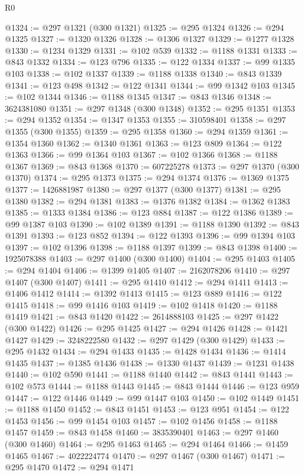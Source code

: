 \begin{lexlean}{R0}
\begin{coremodule}
@1324 := @297 @1321 (@300 @1321)
@1325 := @295 @1324
@1326 := @294 @1325
@1327 := @1320 @1326
@1328 := @1306 @1327
@1329 := @1277 @1328
@1330 := @1234 @1329
@1331 := @102 @539
@1332 := @1188 @1331
@1333 := @843 @1332
@1334 := @123 @796
@1335 := @122 @1334
@1337 := @99 @1335 @103
@1338 := @102 @1337
@1339 := @1188 @1338
@1340 := @843 @1339
@1341 := @123 @498
@1342 := @122 @1341
@1344 := @99 @1342 @103
@1345 := @102 @1344
@1346 := @1188 @1345
@1347 := @843 @1346
@1348 := 3624381080
@1351 := @297 @1348 (@300 @1348)
@1352 := @295 @1351
@1353 := @294 @1352
@1354 := @1347 @1353
@1355 := 310598401
@1358 := @297 @1355 (@300 @1355)
@1359 := @295 @1358
@1360 := @294 @1359
@1361 := @1354 @1360
@1362 := @1340 @1361
@1363 := @123 @809
@1364 := @122 @1363
@1366 := @99 @1364 @103
@1367 := @102 @1366
@1368 := @1188 @1367
@1369 := @843 @1368
@1370 := 607225278
@1373 := @297 @1370 (@300 @1370)
@1374 := @295 @1373
@1375 := @294 @1374
@1376 := @1369 @1375
@1377 := 1426881987
@1380 := @297 @1377 (@300 @1377)
@1381 := @295 @1380
@1382 := @294 @1381
@1383 := @1376 @1382
@1384 := @1362 @1383
@1385 := @1333 @1384
@1386 := @123 @884
@1387 := @122 @1386
@1389 := @99 @1387 @103
@1390 := @102 @1389
@1391 := @1188 @1390
@1392 := @843 @1391
@1393 := @123 @852
@1394 := @122 @1393
@1396 := @99 @1394 @103
@1397 := @102 @1396
@1398 := @1188 @1397
@1399 := @843 @1398
@1400 := 1925078388
@1403 := @297 @1400 (@300 @1400)
@1404 := @295 @1403
@1405 := @294 @1404
@1406 := @1399 @1405
@1407 := 2162078206
@1410 := @297 @1407 (@300 @1407)
@1411 := @295 @1410
@1412 := @294 @1411
@1413 := @1406 @1412
@1414 := @1392 @1413
@1415 := @123 @889
@1416 := @122 @1415
@1418 := @99 @1416 @103
@1419 := @102 @1418
@1420 := @1188 @1419
@1421 := @843 @1420
@1422 := 2614888103
@1425 := @297 @1422 (@300 @1422)
@1426 := @295 @1425
@1427 := @294 @1426
@1428 := @1421 @1427
@1429 := 3248222580
@1432 := @297 @1429 (@300 @1429)
@1433 := @295 @1432
@1434 := @294 @1433
@1435 := @1428 @1434
@1436 := @1414 @1435
@1437 := @1385 @1436
@1438 := @1330 @1437
@1439 := @1231 @1438
@1440 := @102 @590
@1441 := @1188 @1440
@1442 := @843 @1441
@1443 := @102 @573
@1444 := @1188 @1443
@1445 := @843 @1444
@1446 := @123 @959
@1447 := @122 @1446
@1449 := @99 @1447 @103
@1450 := @102 @1449
@1451 := @1188 @1450
@1452 := @843 @1451
@1453 := @123 @951
@1454 := @122 @1453
@1456 := @99 @1454 @103
@1457 := @102 @1456
@1458 := @1188 @1457
@1459 := @843 @1458
@1460 := 3835390401
@1463 := @297 @1460 (@300 @1460)
@1464 := @295 @1463
@1465 := @294 @1464
@1466 := @1459 @1465
@1467 := 4022224774
@1470 := @297 @1467 (@300 @1467)
@1471 := @295 @1470
@1472 := @294 @1471

\end{coremodule}
\end{lexlean}
